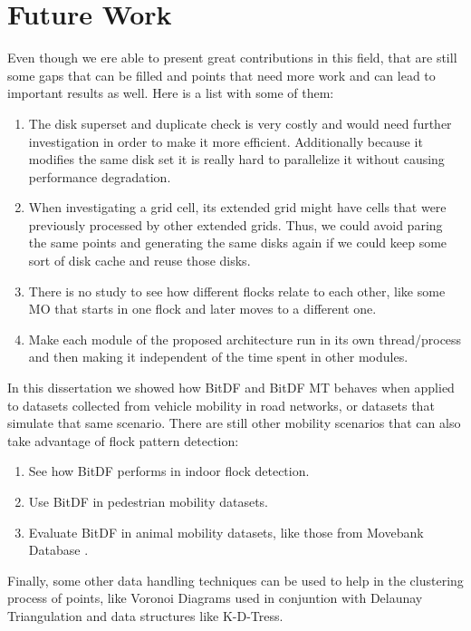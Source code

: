 \section{Future Work}
Even though we ere able to present great contributions in this field, that are still some gaps that can be filled and
points that need more work and can lead to important results as well. Here is a list with some of them:

\begin{enumerate}
    \item The disk superset and duplicate check is very costly and would need further investigation in order to make it
        more efficient. Additionally because it modifies the same disk set it is really hard to parallelize it without
        causing performance degradation.
    \item When investigating a grid cell, its extended grid might have cells that were previously processed by other
        extended grids. Thus, we could avoid paring the same points and generating the same disks again if we could keep
        some sort of disk cache and reuse those disks.
    \item There is no study to see how different flocks relate to each other, like some MO that starts in one flock and
        later moves to a different one.
    \item Make each module of the proposed architecture run in its own thread/process and then making it independent of
        the time spent in other modules.
\end{enumerate}

In this dissertation we showed how BitDF and BitDF MT behaves when applied to datasets collected from vehicle mobility
in road networks, or datasets that simulate that same scenario. There are still other mobility scenarios that can also
take advantage of flock pattern detection:

\begin{enumerate}
    \item See how BitDF performs in indoor flock detection.
    \item Use BitDF in pedestrian mobility datasets.
    \item Evaluate BitDF in animal mobility datasets, like those from Movebank Database \citep{movebank}.
\end{enumerate}

Finally, some other data handling techniques can be used to help in the clustering process of points, like Voronoi
Diagrams used in conjuntion with Delaunay Triangulation and data structures like K-D-Tress.

